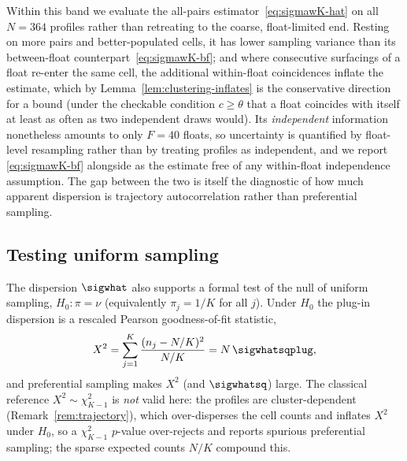Within this band we evaluate the all-pairs
estimator~\eqref{eq:sigmawK-hat} on all $N=364$ profiles rather than
retreating to the coarse, float-limited end. Resting on more pairs and
better-populated cells, it has lower sampling variance than its
between-float counterpart~\eqref{eq:sigmawK-bf}; and where consecutive
surfacings of a float re-enter the same cell, the additional
within-float coincidences inflate the estimate, which by
Lemma~\ref{lem:clustering-inflates} is the conservative direction for a
bound (under the checkable condition $c\ge\theta$ that a float coincides
with itself at least as often as two independent draws would). Its
\emph{independent} information nonetheless amounts to only $F=40$
floats, so uncertainty is quantified by float-level resampling rather
than by treating profiles as independent, and we report
\eqref{eq:sigmawK-bf} alongside as the estimate free of any within-float
independence assumption. The gap between the two is itself the diagnostic
of how much apparent dispersion is trajectory autocorrelation rather than
preferential sampling.


\subsection{Testing uniform sampling}
\label{sec:uniformity-test}

The dispersion $\sigwhat$ also supports a formal test of the null of
uniform sampling, $H_0:\pi=\nu$ (equivalently $\pi_j=1/K$ for all $j$).
Under $H_0$ the plug-in dispersion is a rescaled Pearson
goodness-of-fit statistic,
\[
  X^2=\sum_{j=1}^{K}\frac{(n_j-N/K)^2}{N/K}
     =N\,\sigwhatsqplug,
\]
and preferential sampling makes $X^2$ (and $\sigwhatsq$)
large. The classical reference $X^2\sim\chi^2_{K-1}$ is \emph{not} valid
here: the profiles are cluster-dependent (Remark~\ref{rem:trajectory}),
which over-disperses the cell counts and inflates $X^2$ under $H_0$, so a
$\chi^2_{K-1}$ $p$-value over-rejects and reports spurious preferential
sampling; the sparse expected counts $N/K$ compound this.

